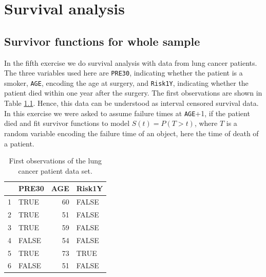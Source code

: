 \chapter{Survival analysis}
\section{Survivor functions for whole sample}
In the fifth exercise we do survival analysis with data from lung cancer patients. The three variables used here are \texttt{PRE30}, indicating whether the patient is a smoker, \texttt{AGE}, encoding the age at surgery, and \texttt{Risk1Y}, indicating whether the patient died within one year after the surgery. The first observations are shown in Table \ref{5table}. Hence, this data can be understood as interval censored survival data. In this exercise we were asked to assume failure times at \texttt{AGE}+1, if the patient died and fit survivor functions to model $S(t)=P(T>t)$, where $T$ is a random variable encoding the failure time of an object, here the time of death of a patient. 
\begin{table}[ht]
\centering
\begin{tabular}{llrl}
  \hline
 & PRE30 & AGE & Risk1Y \\ 
  \hline
1 & TRUE &  60 & FALSE \\ 
  2 & TRUE &  51 & FALSE \\ 
  3 & TRUE &  59 & FALSE \\ 
  4 & FALSE &  54 & FALSE \\ 
  5 & TRUE &  73 & TRUE \\ 
  6 & FALSE &  51 & FALSE \\ 
   \hline
\end{tabular}
\caption{First observations of the lung cancer patient data set.}
\label{5table}
\end{table}

